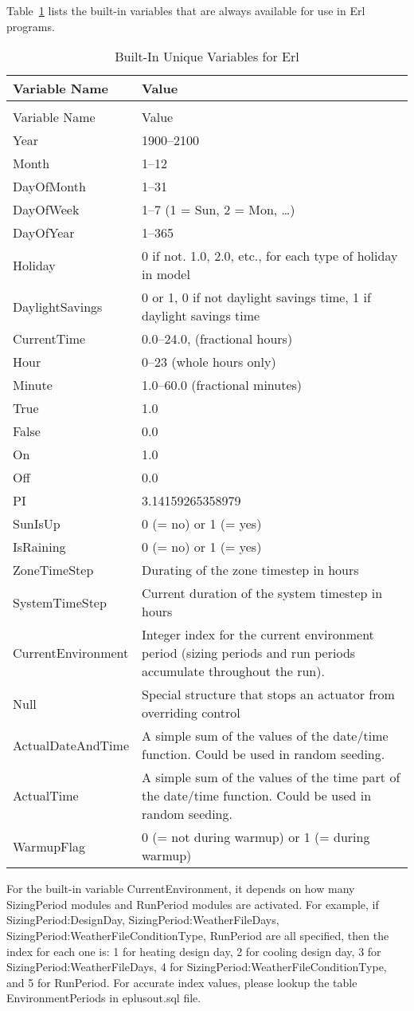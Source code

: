 Table~\ref{table:built-in-unique-variables-for-erl} lists the built-in variables that are always available for use in Erl programs.

\begin{longtable}[c]{p{1.5in}p{4.5in}}
\caption{Built-In Unique Variables for Erl \label{table:built-in-unique-variables-for-erl}} \tabularnewline
\toprule 
Variable Name & Value \tabularnewline
\midrule
\endfirsthead

\caption[]{Built-In Unique Variables for Erl} \tabularnewline
\toprule 
Variable Name & Value \tabularnewline
\midrule
\endhead

Year & 1900--2100 \tabularnewline
Month & 1--12 \tabularnewline
DayOfMonth & 1--31 \tabularnewline
DayOfWeek & 1--7 (1 = Sun, 2 = Mon, \ldots) \tabularnewline
DayOfYear & 1--365 \tabularnewline
Holiday & 0 if not. 1.0, 2.0, etc., for each type of holiday in model \tabularnewline
DaylightSavings & 0 or 1, 0 if not daylight savings time, 1 if daylight savings time \tabularnewline
CurrentTime & 0.0--24.0, (fractional hours) \tabularnewline
Hour & 0--23 (whole hours only) \tabularnewline
Minute & 1.0--60.0 (fractional minutes) \tabularnewline
True & 1.0 \tabularnewline
False & 0.0 \tabularnewline
On & 1.0 \tabularnewline
Off & 0.0 \tabularnewline
PI & 3.14159265358979 \tabularnewline
SunIsUp & 0 (= no) or 1 (= yes) \tabularnewline
IsRaining & 0 (= no) or 1 (= yes) \tabularnewline
ZoneTimeStep & Durating of the zone timestep in hours \tabularnewline
SystemTimeStep & Current duration of the system timestep in hours \tabularnewline
CurrentEnvironment & Integer index for the current environment period (sizing periods and run periods accumulate throughout the run). \tabularnewline
Null & Special structure that stops an actuator from overriding control \tabularnewline
ActualDateAndTime & A simple sum of the values of the date/time function. Could be used in random seeding. \tabularnewline
ActualTime & A simple sum of the values of the time part of the date/time function. Could be used in random seeding. \tabularnewline
WarmupFlag & 0 (= not during warmup) or 1 (= during warmup) \tabularnewline
\bottomrule
\end{longtable}

For the built-in variable CurrentEnvironment, it depends on how many SizingPeriod modules and RunPeriod modules are activated. For example, if SizingPeriod:DesignDay, SizingPeriod:WeatherFileDays, SizingPeriod:WeatherFileConditionType, RunPeriod are all specified, then the index for each one is: 1 for heating design day, 2 for cooling design day, 3 for SizingPeriod:WeatherFileDays, 4 for SizingPeriod:WeatherFileConditionType, and 5 for RunPeriod. For accurate index values, please lookup the table EnvironmentPeriods in eplusout.sql file.

